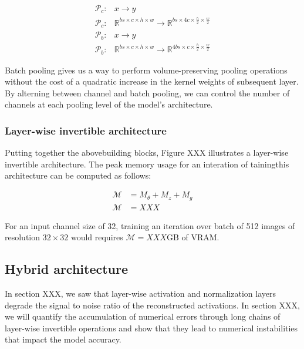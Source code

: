 \documentclass[twocolumn]{bmcart}
\begin{document}
\begin{subequations}
\begin{align}
	\mathcal{P}_c :& x \rightarrow y \\
	\mathcal{P}_c :& \mathbb{R}^{bs \times c \times h \times w}  \rightarrow \mathbb{R}^{bs \times 4c \times \frac{h}{2} \times \frac{w}{2}}\\
	\mathcal{P}_b :& x \rightarrow y \\
    \mathcal{P}_b :&  \mathbb{R}^{bs \times c \times h \times w}  \rightarrow \mathbb{R}^{4bs \times c \times \frac{h}{2} \times \frac{w}{2}}
\end{align}
\end{subequations}

Batch pooling gives us a way to perform volume-preserving pooling operations without the cost of a quadratic increase in the kernel weights of subsequent layer. 
By alterning between channel and batch pooling, we can control the number of channels at each pooling level of the model's architecture.

\subsubsection{Layer-wise invertible architecture}

Putting together the abovebuilding blocks, Figure XXX illustrates a layer-wise invertible architecture.
The peak memory usage for an interation of tainingthis architecture can be computed as follows:

\begin{subequations}
\begin{align}
\mathcal{M} &= M_{\theta} + M_{z} + M_{g} \\
\mathcal{M} &= XXX
\end{align}
\end{subequations}

For an input channel size of 32, training an iteration over batch of 512 images of resolution $32 \times 32$ would requires $\mathcal{M}=XXX$GB of VRAM. 

\subsection{Hybrid architecture}

In section XXX, we saw that layer-wise activation and normalization layers degrade the signal to noise ratio of the reconstructed activations.
In section XXX, we will quantify the accumulation of numerical errors through long chains of layer-wise invertible operations and show that they lead to numerical instabilities that impact the model accuracy.
\end{document}
